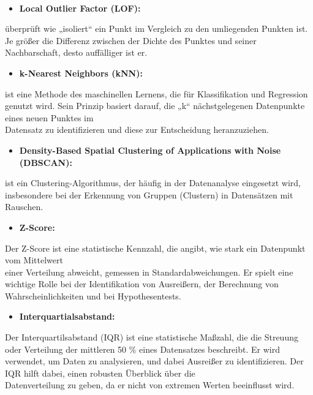 \\
\begin{itemize} \item \textbf{Local Outlier Factor (LOF):}\end{itemize} überprüft wie „isoliert“ ein Punkt im Vergleich zu den umliegenden Punkten ist. Je größer die Differenz zwischen der Dichte des Punktes und seiner Nachbarschaft, desto auffälliger ist er\cite{LOF}. 
\newpage
\begin{itemize} \item \textbf{k-Nearest Neighbors (kNN):}\end{itemize} ist eine Methode des maschinellen Lernens, die für Klassifikation und Regression genutzt wird. Sein Prinzip basiert darauf, die „k“ nächstgelegenen Datenpunkte eines neuen Punktes im \\Datensatz zu identifizieren und diese zur Entscheidung heranzuziehen\cite{LOF}. 
\\
\begin{itemize} \item \textbf{Density-Based Spatial Clustering of Applications with Noise (DBSCAN):}\end{itemize} ist ein Clustering-Algorithmus, der häufig in der Datenanalyse eingesetzt wird, insbesondere bei der Erkennung von Gruppen (Clustern) in Datensätzen mit Rauschen\cite{LOF}.
\\
\begin{itemize} \item \textbf{Z-Score:}\end{itemize} Der Z-Score ist eine statistische Kennzahl, die angibt, wie stark ein Datenpunkt vom Mittelwert \\ einer Verteilung abweicht, gemessen in Standardabweichungen.
Er spielt eine wichtige Rolle bei der Identifikation von Ausreißern, der Berechnung von Wahrscheinlichkeiten und bei Hypothesentests\cite{IQR}.
\\
\begin{itemize} \item \textbf{Interquartialsabstand:}\end{itemize} Der Interquartilsabstand (IQR) ist eine statistische Maßzahl, die die Streuung oder Verteilung der mittleren 50 \% eines Datensatzes beschreibt. Er wird verwendet, um Daten zu analysieren, und dabei Ausreißer zu identifizieren. Der IQR hilft dabei, einen robusten Überblick über die \\ Datenverteilung zu geben, da er nicht von extremen Werten beeinflusst wird\cite{IQR}. 
\\
